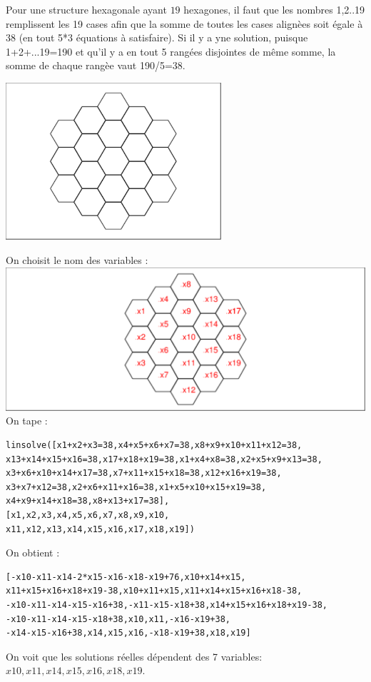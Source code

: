 \documentclass[a4paper,11pt]{book}
\begin{document}
Pour une structure hexagonale ayant $19$ hexagones, il faut que les nombres 
1,2..19 remplissent les 19 cases afin que la somme de toutes les cases 
align\`ees soit \'egale \`a 38 (en tout 5*3 \'equations \`a satisfaire).
Si il y a yne solution, puisque 1+2+...19=190 et qu'il y a en tout 5 rang\'ees 
disjointes de m\^eme somme, la somme de chaque rang\`ee vaut 190/5=38.
\begin{center}\includegraphics[width=8cm]{hexagone3}\end{center}
On choisit le nom des variables :\\

\includegraphics[width=\textwidth]{hexagone4}\\
On tape :
\begin{verbatim}
linsolve([x1+x2+x3=38,x4+x5+x6+x7=38,x8+x9+x10+x11+x12=38,
x13+x14+x15+x16=38,x17+x18+x19=38,x1+x4+x8=38,x2+x5+x9+x13=38,
x3+x6+x10+x14+x17=38,x7+x11+x15+x18=38,x12+x16+x19=38,
x3+x7+x12=38,x2+x6+x11+x16=38,x1+x5+x10+x15+x19=38,
x4+x9+x14+x18=38,x8+x13+x17=38],
[x1,x2,x3,x4,x5,x6,x7,x8,x9,x10,
x11,x12,x13,x14,x15,x16,x17,x18,x19])
\end{verbatim}
On obtient :
\begin{verbatim}
[-x10-x11-x14-2*x15-x16-x18-x19+76,x10+x14+x15,
x11+x15+x16+x18+x19-38,x10+x11+x15,x11+x14+x15+x16+x18-38,
-x10-x11-x14-x15-x16+38,-x11-x15-x18+38,x14+x15+x16+x18+x19-38,
-x10-x11-x14-x15-x18+38,x10,x11,-x16-x19+38,
-x14-x15-x16+38,x14,x15,x16,-x18-x19+38,x18,x19]
\end{verbatim}
On voit que les solutions r\'eelles d\'ependent des 7 variables:\\
 $x10,x11,x14,x15,x16,x18,x19$.\\
\end{document}
